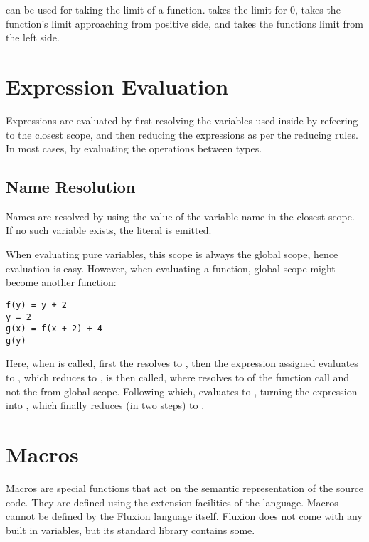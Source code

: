 \documentclass[11pt,a4paper]{book}
\begin{document}
\code{->} can be used for taking the limit of a function.  takes the limit for 0,  takes the function's limit approaching from positive side, and  takes the functions limit from the left side.

\section{Expression Evaluation}

Expressions are evaluated by first resolving the variables used inside by refeering to the closest scope, and then reducing the expressions as per the reducing rules. In most cases, by evaluating the operations between types. \\

\subsection{Name Resolution}

Names are resolved by using the value of the variable name in the closest scope. If no such variable exists, the  literal is emitted.

When evaluating pure variables, this scope is always the global scope, hence evaluation is easy. However, when evaluating a function, global scope might become another function:

\begin{lstlisting}
f(y) = y + 2
y = 2
g(x) = f(x + 2) + 4
g(y)
\end{lstlisting}

Here, when  is called, first the  resolves to , then the expression assigned evaluates to , which reduces to ,  is then called, where  resolves to  of the function call and not the  from global scope. Following which,  evaluates to , turning the expression into , which finally reduces (in two steps) to .

\section{Macros}

Macros are special functions that act on the semantic representation of the source code. They are defined using the extension facilities of the language. Macros cannot be defined by the Fluxion language itself. Fluxion does not come with any built in variables, but its standard library contains some.
\end{document}
